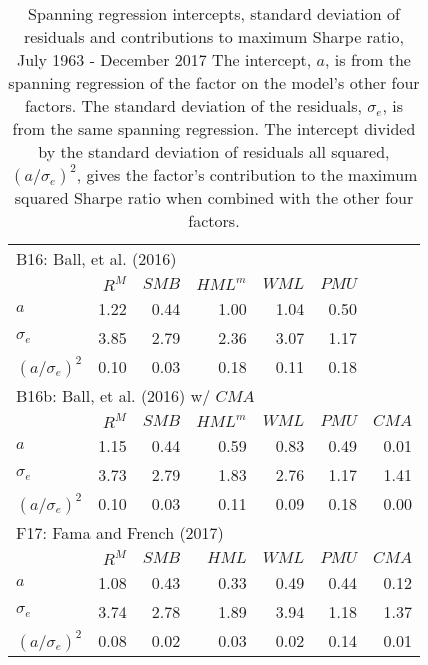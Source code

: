 
\begin{table}[!ht]
\scriptsize
\centering
\caption{
\scriptsize{
Spanning regression intercepts, standard deviation of residuals and contributions to
maximum Sharpe ratio, July 1963 - December 2017 The intercept, $a$, is from the spanning
regression of the factor on the model’s other four factors. The standard deviation of the
residuals, $\sigma_e$, is from the same spanning regression. The intercept divided by the
standard deviation of residuals all squared, $\left( a/\sigma_e\right) ^2$, gives the
factor's contribution to the maximum squared Sharpe ratio when combined with the other
four factors.
}
}
\begin{tabular}{lrrrrrr}
  \toprule
  \multicolumn{7}{l}{B16: Ball, et al. (2016)}  \\
                                &  $R^M$ &  $SMB$ &$HML^m$ &  $WML$ &  $PMU$ &   \\
  $a$                           &  1.22  &  0.44  &  1.00  &  1.04  &  0.50  &   \\
  $\sigma_e$                    &  3.85  &  2.79  &  2.36  &  3.07  &  1.17  &   \\
  $\left( a/\sigma_e\right) ^2$ &  0.10  &  0.03  &  0.18  &  0.11  &  0.18  &   \\
[1em]
  \multicolumn{7}{l}{B16b: Ball, et al. (2016) w/ $CMA$}  \\
                                &  $R^M$ &  $SMB$ &$HML^m$ &  $WML$ &  $PMU$ &  $CMA$ \\
  $a$                           &  1.15  &  0.44  &  0.59  &  0.83  &  0.49  &  0.01  \\
  $\sigma_e$                    &  3.73  &  2.79  &  1.83  &  2.76  &  1.17  &  1.41  \\
  $\left( a/\sigma_e\right) ^2$ &  0.10  &  0.03  &  0.11  &  0.09  &  0.18  &  0.00  \\
[1em]
  \multicolumn{7}{l}{F17: Fama and French (2017)}  \\
                                &  $R^M$ &  $SMB$ &  $HML$ &  $WML$ &  $PMU$ &  $CMA$ \\
  $a$                           &  1.08  &  0.43  &  0.33  &  0.49  &  0.44  &  0.12  \\
  $\sigma_e$                    &  3.74  &  2.78  &  1.89  &  3.94  &  1.18  &  1.37  \\
  $\left( a/\sigma_e\right) ^2$ &  0.08  &  0.02  &  0.03  &  0.02  &  0.14  &  0.01  \\
  \bottomrule
\end{tabular}
\label{tbl:contributions}
\end{table}
